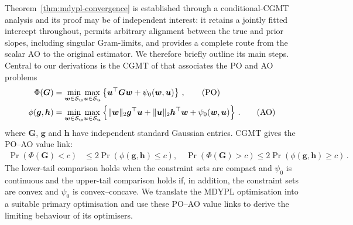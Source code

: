 \documentclass{article}
\makeatletter
\theoremstyle{definition}
\newcommand{\vnorm}[1]{%
	\ensuremath{%
		\if@display
		\left\| #1 \right\|
		\else
		\| #1 \|
		\fi
	}%
}
\newcommand*{\bb}{\boldsymbol}
\def\bw {\bb{w}}
\def\bu{\bb{u}}
\def\bh{\bb{h}}
\def\bg{\bb{g}}
\makeatother
\begin{document}
\begin{bibunit}
Theorem~\ref{thm:mdypl-convergence} is established through a conditional-CGMT
analysis and its proof may be of independent interest: it retains a jointly
fitted intercept throughout, permits arbitrary alignment between the true
and prior slopes, including singular Gram-limits, and provides a complete
route from the scalar AO to the original estimator. We therefore briefly
outline its main steps.
Central to our derivations is the CGMT of
\citet[Theorem~VI.1]{thrampoulidis+etal:2018} that associates the PO and AO problems
\begin{align}
    \Phi(\bb G)
    &=
    \underset{\bw\in\mathcal S_{\bw}}{\min}
    \underset{\bu\in\mathcal S_{\bu}}{\max}
    \left\{
        \bu^\top\bb G\bw+\psi_0(\bw,\bu)
    \right\} \,,
    \tag{PO}\label{eq:cgmt-pair-main}
    \\
    \phi(\bg,\bh)
    &=
    \underset{\bw\in\mathcal S_{\bw}}{\min}
    \underset{\bu\in\mathcal S_{\bu}}{\max}
    \left\{
        \vnorm{\bw}_2\bg^\top\bu
        +
        \vnorm{\bu}_2\bh^\top\bw
        +
        \psi_0(\bw,\bu)
    \right\} \,.
    \tag{AO}
\end{align}
where $\bb G$, $\bg$ and $\bh$ have independent standard Gaussian entries.
CGMT gives the PO--AO value link:
\begin{equation}
\label{eq:cgmt-value-links-main}
\begin{aligned}
    \Pr(\Phi(\bb G)<c)
    &\leq
    2\Pr(\phi(\bg,\bh)\leq c),
    \quad
    \Pr(\Phi(\bb G)>c)
    \leq
    2\Pr(\phi(\bg,\bh)\geq c) \,. 
\end{aligned}
\end{equation}
The lower-tail comparison holds when the constraint sets are compact and
$\psi_0$ is continuous and the upper-tail comparison holds if, in addition,
the constraint sets are convex and $\psi_0$ is convex--concave.
We translate the MDYPL optimisation into a suitable primary optimisation and
use these PO--AO value links to derive the limiting behaviour of its
optimisers.


\end{bibunit}
\end{document}
